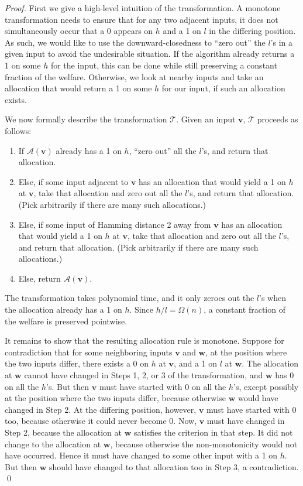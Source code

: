 \documentclass[runningheads,a4paper]{llncs}
\begin{document}
\begin{proof}
First we give a high-level intuition of the transformation. A monotone transformation needs to ensure that for any two adjacent inputs, it does not simultaneously occur that a 0 appears on $h$ and a 1 on $l$ in the differing position. As such, we would like to use the downward-closedness to ``zero out'' the $l$'s in a given input to avoid the undesirable situation. If the algorithm already returns a 1 on some $h$ for the input, this can be done while still preserving a constant fraction of the welfare. Otherwise, we look at nearby inputs and take an allocation that would return a 1 on some $h$ for our input, if such an allocation exists.

We now formally describe the transformation $\mathcal{T}$. Given an input $\textbf{v}$, $\mathcal{T}$ proceeds as follows:

\begin{enumerate}
\item If $\mathcal{A}(\textbf{v})$ already has a 1 on $h$, ``zero out'' all the $l$'s, and return that allocation. 
\item Else, if some input adjacent to $\textbf{v}$ has an allocation that would yield a 1 on $h$ at $\textbf{v}$, take that allocation and zero out all the $l$'s, and return that allocation. (Pick arbitrarily if there are many such allocations.)
\item Else, if some input of Hamming distance 2 away from $\textbf{v}$ has an allocation that would yield a 1 on $h$ at $\textbf{v}$, take that allocation and zero out all the $l$'s, and return that allocation. (Pick arbitrarily if there are many such allocations.)
\item Else, return $\mathcal{A}(\textbf{v})$.
\end{enumerate} 

The transformation takes polynomial time, and it only zeroes out the $l$'s when the allocation already has a 1 on $h$. Since $h/l=\Omega(n)$, a constant fraction of the welfare is preserved pointwise.

It remains to show that the resulting allocation rule is monotone. Suppose for contradiction that for some neighboring inputs $\textbf{v}$ and $\textbf{w}$, at the position where the two inputs differ, there exists a 0 on $h$ at $\textbf{v}$, and a 1 on $l$ at $\textbf{w}$. The allocation at $\textbf{w}$ cannot have changed in Steps 1, 2, or 3 of the transformation, and $\textbf{w}$ has 0 on all the $h$'s. But then $\textbf{v}$ must have started with 0 on all the $h$'s, except possibly at the position where the two inputs differ, because otherwise $\textbf{w}$ would have changed in Step 2. At the differing position, however, $\textbf{v}$ must have started with $0$ too, because otherwise it could never become 0. Now, $\textbf{v}$ must have changed in Step 2, because the allocation at $\textbf{w}$ satisfies the criterion in that step. It did not change to the allocation at $\textbf{w}$, because otherwise the non-monotonicity would not have occurred. Hence it must have changed to some other input with a 1 on $h$. But then $\textbf{w}$ should have changed to that allocation too in Step 3, a contradiction. \qed
\end{proof}
\end{document}
